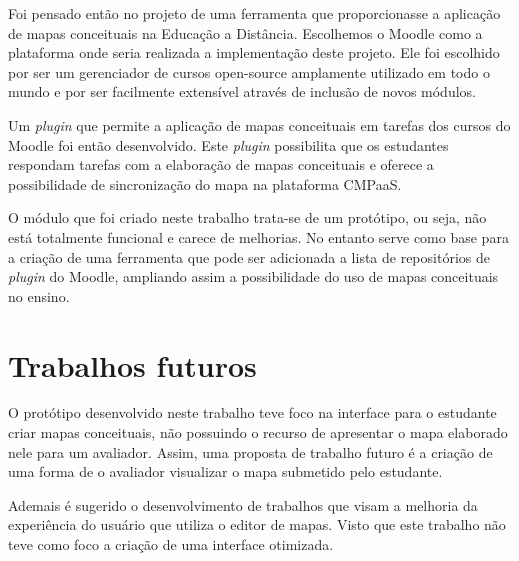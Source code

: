 \documentclass[
	12pt,				%
	openright,			%
	oneside,			%
	a4paper,			%
	english,			%
	french,				%
	spanish,			%
	brazil				%
	]{abntex2}
\begin{document}
Foi pensado então no projeto de uma ferramenta que proporcionasse a aplicação de mapas conceituais na Educação a Distância. Escolhemos o Moodle como a plataforma onde seria realizada a implementação deste projeto. Ele foi escolhido por ser um gerenciador de cursos open-source amplamente utilizado em todo o mundo e por ser facilmente extensível através de inclusão de novos módulos.

Um \textit{plugin} que permite a aplicação de mapas conceituais em tarefas dos cursos do Moodle foi então desenvolvido. Este \textit{plugin} possibilita que os estudantes respondam tarefas com a elaboração de mapas conceituais e oferece a possibilidade de sincronização do mapa na plataforma CMPaaS. 

O módulo que foi criado neste trabalho trata-se de um protótipo, ou seja, não está totalmente funcional e carece de melhorias. No entanto serve como base para a criação de uma ferramenta que pode ser adicionada a lista de repositórios de \textit{plugin} do Moodle, ampliando assim a possibilidade do uso de mapas conceituais no ensino.         

\section{Trabalhos futuros}

O protótipo desenvolvido neste trabalho teve foco na interface para o estudante criar mapas conceituais, não possuindo o recurso de apresentar o mapa elaborado nele para um avaliador. Assim, uma proposta de trabalho futuro é a criação de uma forma de o avaliador visualizar o mapa submetido pelo estudante.

Ademais é sugerido o desenvolvimento de trabalhos que visam a melhoria da experiência do usuário que utiliza o editor de mapas. Visto que este trabalho não teve como foco a criação de uma interface otimizada.

\postextual



%
%
\end{document}
